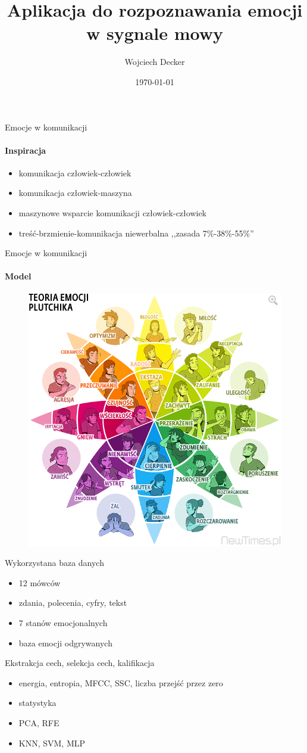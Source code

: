 \documentclass{beamer}
\author{Wojciech Decker}
\title[Aplikacja do rozpoznawania emocji w sygnale mowy]
{Aplikacja do rozpoznawania emocji w sygnale mowy}
\date{\today}
\begin{document}
\titlepageframe %
\begin{frame}[t,fragile]{Emocje w komunikacji}
\framesubtitle{Inspiracja}
\begin{itemize}
\item komunikacja człowiek-człowiek
\item komunikacja człowiek-maszyna
\item maszynowe wsparcie komunikacji człowiek-człowiek
\item treść-brzmienie-komunikacja niewerbalna ,,zasada 7\%-38\%-55\%''
\end{itemize}
\end{frame}
\begin{frame}[t,fragile]{Emocje w komunikacji}
\framesubtitle{Model}
  \begin{figure}
   \centering
   \includegraphics[height = 0.5\textwidth]{./plutchik}
  \end{figure}
\end{frame}
\begin{frame}[t,fragile]{Wykorzystana baza danych}
\begin{itemize}
\item 12 mówców
\item zdania, polecenia, cyfry, tekst
\item 7 stanów emocjonalnych 
\item baza emocji odgrywanych
\end{itemize}
\end{frame}
\begin{frame}[t,fragile]{Ekstrakcja cech, selekcja cech, kalifikacja}
\begin{itemize}
\item energia, entropia, MFCC, SSC, liczba przejść przez zero
\item statystyka
\item PCA, RFE
\item KNN, SVM, MLP
\end{itemize}
\end{frame}
\end{document}
